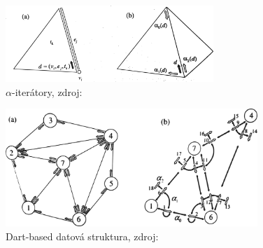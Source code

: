 \documentclass[12pt,a4paper]{article}
\begin{document}
\begin{figure}[h!]
\centering
\includegraphics[width=0.7\textwidth]{img/iterators.png}
\caption{$\alpha$-iterátory, zdroj: \cite{triangulation}}
\label{fig:iterators}
\end{figure}

\begin{figure}[h!]
\centering
\includegraphics[width=0.85\textwidth]{img/dart_struct.png}
\caption{Dart-based datová struktura, zdroj: \cite{triangulation}}
\label{fig:dart_struct}
\end{figure}
\end{document}
